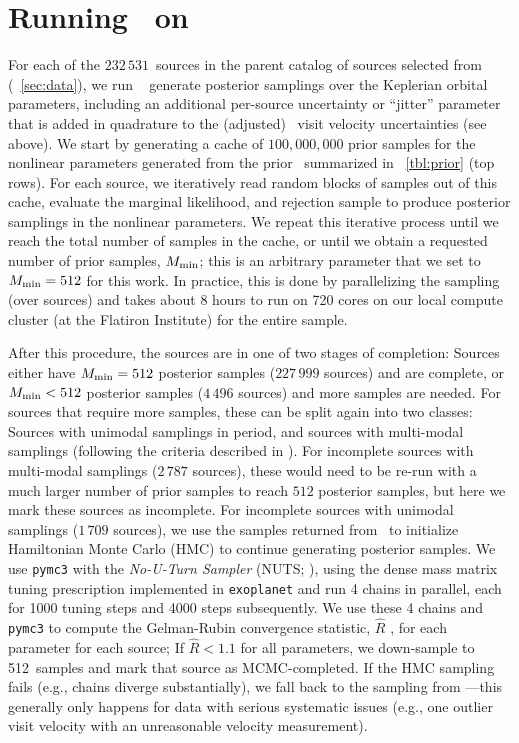 \documentclass[modern]{aastex63}
\newcommand{\nsources}{\ensuremath{232\,531}}
\newcommand{\Kmin}{M_{\rm min}}
\newcommand{\Kminval}{512}
\begin{document}
\section{Running \thejoker\ on \apogee\ } \label{sec:rundr16}

For each of the \nsources\ sources in the parent catalog of sources selected
from \apogee\  (\sectionname~\ref{sec:data}), we run \thejoker\
\citep{thejoker} generate posterior samplings over the Keplerian orbital
parameters, including an additional per-source uncertainty or ``jitter''
parameter that is added in quadrature to the (adjusted) \apogee\ visit velocity
uncertainties (see above).
We start by generating a cache of $100,000,000$ prior samples for the nonlinear
parameters generated from the prior \pdf\ summarized in
\tablename~\ref{tbl:prior} (top rows).
For each source, we iteratively read random blocks of samples out of this cache,
evaluate the marginal likelihood, and rejection sample to produce posterior
samplings in the nonlinear parameters.
We repeat this iterative process until we reach the total number of samples in
the cache, or until we obtain a requested number of prior samples, $\Kmin$; this
is an arbitrary parameter that we set to $\Kmin = \Kminval$ for this work.
In practice, this is done by parallelizing the sampling (over sources) and takes
about 8 hours to run on 720 cores on our local compute cluster (at the Flatiron
Institute) for the entire sample.

After this procedure, the sources are in one of two stages of completion:
Sources either have $\Kmin = \Kminval$ posterior samples ($227\,999$ sources)
and are complete, or $\Kmin < \Kminval$ posterior samples ($4\,496$ sources) and
more samples are needed.
For sources that require more samples, these can be split again into two
classes: Sources with unimodal samplings in period, and sources with multi-modal
samplings (following the criteria described in \citealt{thejoker}).
For incomplete sources with multi-modal samplings ($2\,787$ sources), these
would need to be re-run with a much larger number of prior samples to reach
$\Kminval$ posterior samples, but here we mark these sources as incomplete.
For incomplete sources with unimodal samplings ($1\,709$ sources), we use the
samples returned from \thejoker\ to initialize Hamiltonian Monte Carlo (HMC) to
continue generating posterior samples.
We use \texttt{pymc3} with the \emph{No-U-Turn Sampler} (NUTS; \citealt{NUTS}),
using the dense mass matrix tuning prescription implemented in
\texttt{exoplanet} \citep{exoplanet:exoplanet} and run 4 chains in parallel,
each for 1000 tuning steps and 4000 steps subsequently.
We use these 4 chains and \texttt{pymc3} to compute the Gelman-Rubin convergence
statistic, $\hat{R}$ \citep{Gelman:1992}, for each parameter for each source; If
$\hat{R} < 1.1$ for all parameters, we down-sample to \Kminval\ samples and mark
that source as MCMC-completed.
If the HMC sampling fails (e.g., chains diverge substantially), we fall back to
the sampling from \thejoker---this generally only happens for data with serious
systematic issues (e.g., one outlier visit velocity with an unreasonable
velocity measurement).
\end{document}
